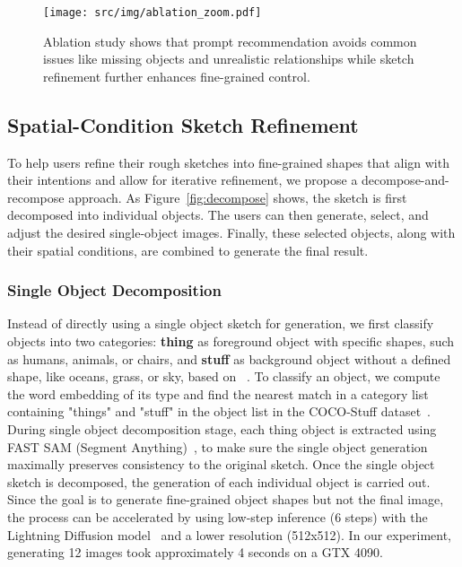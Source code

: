 \begin{figure*}[t]
    \centering
    \texttt{[image: src/img/ablation\_zoom.pdf]}
    \vspace{-2mm}
    \caption{Ablation study shows that prompt recommendation avoids common issues like missing objects and unrealistic relationships while sketch refinement further enhances fine-grained control.}
    \label{fig:ablation}
    \vspace{-4mm}
\end{figure*}

\subsection{Spatial-Condition Sketch Refinement}
\label{ssec:sketch_refine}
To help users refine their rough sketches into fine-grained shapes that align with their intentions and allow for iterative refinement, we propose a decompose-and-recompose approach. 
As Figure~\ref{fig:decompose} shows, the sketch is first decomposed into individual objects.
The users can then generate, select, and adjust the desired single-object images. 
Finally, these selected objects, along with their spatial conditions, are combined to generate the final result.

\subsubsection{Single Object Decomposition}
Instead of directly using a single object sketch for generation, we first classify objects into two categories: \textbf{thing} as foreground object with specific shapes, such as humans, animals, or chairs, and \textbf{stuff} as background object without a defined shape, like oceans, grass, or sky, based on ~\cite{caesar2018coco}. 
To classify an object, we compute the word embedding of its type and find the nearest match in a category list containing "things" and "stuff" in the object list in the COCO-Stuff dataset~\cite{caesar2018coco}.
During single object decomposition stage, each thing object is extracted using FAST SAM (Segment Anything)~\cite{zhao2023fast}, to make sure the single object generation maximally preserves consistency to the original sketch.
Once the single object sketch is decomposed, the generation of each individual object is carried out. 
Since the goal is to generate fine-grained object shapes but not the final image, the process can be accelerated by using low-step inference (6 steps) with the Lightning Diffusion model~\cite{luo2023lcm} and a lower resolution (512x512). 
In our experiment, generating 12 images took approximately 4 seconds on a GTX 4090.


